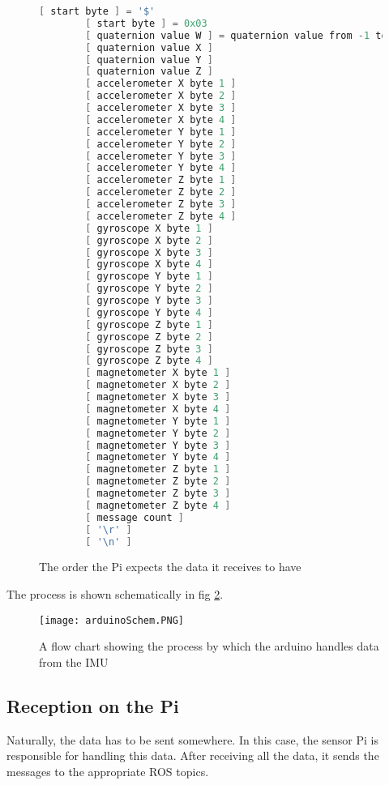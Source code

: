 \begin{figure}[H]
    \begin{lstlisting}[language=c++,firstnumber=0]
        [ start byte ] = '$'
        [ start byte ] = 0x03
        [ quaternion value W ] = quaternion value from -1 to +1, multiplied by 100
        [ quaternion value X ]
        [ quaternion value Y ]
        [ quaternion value Z ]
        [ accelerometer X byte 1 ]
        [ accelerometer X byte 2 ]
        [ accelerometer X byte 3 ]
        [ accelerometer X byte 4 ]
        [ accelerometer Y byte 1 ]
        [ accelerometer Y byte 2 ]
        [ accelerometer Y byte 3 ]
        [ accelerometer Y byte 4 ]
        [ accelerometer Z byte 1 ]
        [ accelerometer Z byte 2 ]
        [ accelerometer Z byte 3 ]
        [ accelerometer Z byte 4 ]
        [ gyroscope X byte 1 ] 
        [ gyroscope X byte 2 ]
        [ gyroscope X byte 3 ]
        [ gyroscope X byte 4 ]       
        [ gyroscope Y byte 1 ] 
        [ gyroscope Y byte 2 ]
        [ gyroscope Y byte 3 ]
        [ gyroscope Y byte 4 ] 
        [ gyroscope Z byte 1 ] 
        [ gyroscope Z byte 2 ]
        [ gyroscope Z byte 3 ]
        [ gyroscope Z byte 4 ] 
        [ magnetometer X byte 1 ]
        [ magnetometer X byte 2 ]
        [ magnetometer X byte 3 ]
        [ magnetometer X byte 4 ]
        [ magnetometer Y byte 1 ]
        [ magnetometer Y byte 2 ]
        [ magnetometer Y byte 3 ]
        [ magnetometer Y byte 4 ]
        [ magnetometer Z byte 1 ]
        [ magnetometer Z byte 2 ]
        [ magnetometer Z byte 3 ]
        [ magnetometer Z byte 4 ]
        [ message count ]
        [ '\r' ] 
        [ '\n' ] 
    \end{lstlisting} 
\caption{The order the Pi expects the data it receives to have}
\label{fig::dataformat}
\end{figure}

The process is shown schematically in fig \ref{fig::ardschem}.

\begin{figure}[H]
\centering
\texttt{[image: arduinoSchem.PNG]}
\caption{A flow chart showing the process by which the arduino handles data from the IMU}
\label{fig::ardschem}
\end{figure}

\subsection{Reception on the Pi}
Naturally, the data has to be sent somewhere.
In this case, the sensor Pi is responsible for handling this data.
After receiving all the data, it sends the messages to the appropriate ROS topics.

